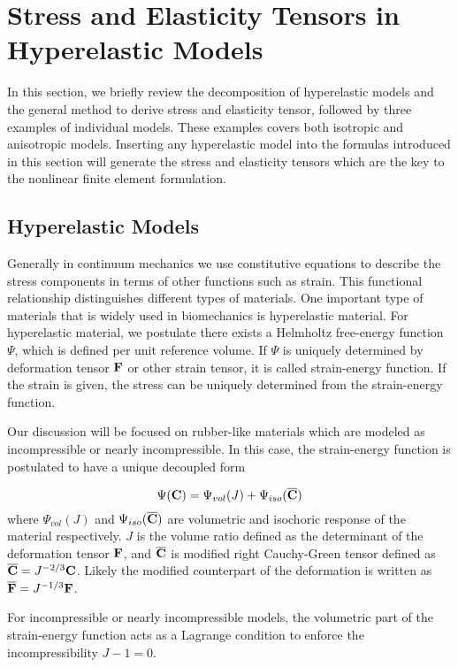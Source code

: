\section{Stress and Elasticity Tensors in Hyperelastic Models} \label{general}
In this section, we briefly review the decomposition of hyperelastic models and the general method to derive stress and elasticity tensor, followed by three examples of individual models. These examples covers both isotropic and anisotropic models. Inserting any hyperelastic model into the formulas introduced in this section will generate the stress and elasticity tensors which are the key to the nonlinear finite element formulation.

%
\subsection{Hyperelastic Models}
Generally in continuum mechanics we use constitutive equations to describe the stress components in terms of other functions such as strain. This functional relationship distinguishes different types of materials. One important type of materials that is widely used in biomechanics is hyperelastic material. For hyperelastic material, we postulate there exists a Helmholtz free-energy function $\Psi$, which is defined per unit reference volume. If $\Psi$ is uniquely determined by deformation tensor $\bold{F}$ or other strain tensor, it is called strain-energy function. If the strain is given, the stress can be uniquely determined from the strain-energy function.  

Our discussion will be focused on rubber-like materials which are modeled as incompressible or nearly incompressible. In this case, the strain-energy function is postulated to have a unique decoupled form

\begin{equation} \label{energy_split}
\Psi(\bold{C}) = \Psi_{vol}(J) + \Psi_{iso}(\overline{\bold{C}})
\end{equation}
where $\Psi_{vol}(J)$ and $\Psi_{iso}(\overline{\bold{C}})$ are volumetric and isochoric response of the material respectively. $J$ is the volume ratio defined as the determinant of the deformation tensor $\bold{F}$, and $\overline{\bold{C}}$ is modified right Cauchy-Green tensor defined as 
$\overline{\bold{C}}  = J^{-2/3} \bold{C}$. Likely the modified counterpart of the deformation is written as $\overline{\bold{F}} = J^{-1/3} \bold{F}$. 

For incompressible or nearly incompressible models, the volumetric part of the strain-energy function acts as a Lagrange condition to enforce the incompressibility $J -1 = 0$.


